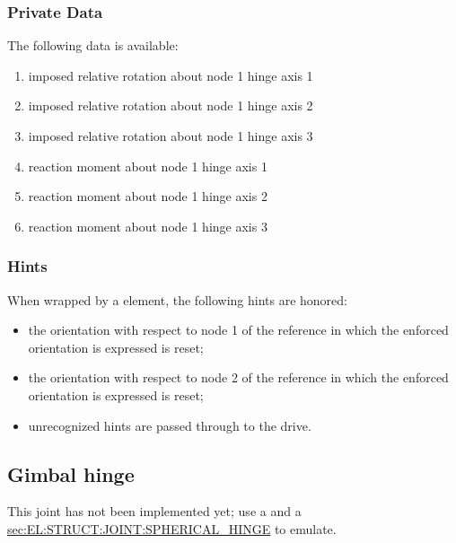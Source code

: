 \subsubsection{Private Data}
The following data is available:
\begin{enumerate}
\item {} imposed relative rotation about node 1 hinge axis 1
\item {} imposed relative rotation about node 1 hinge axis 2
\item {} imposed relative rotation about node 1 hinge axis 3
\item {} reaction moment about node 1 hinge axis 1
\item {} reaction moment about node 1 hinge axis 2
\item {} reaction moment about node 1 hinge axis 3
\end{enumerate}

\subsubsection{Hints}
When wrapped by a  element, the following hints are honored:
\begin{itemize}
\item {} the orientation with respect to node 1
of the reference in which the enforced orientation is expressed is reset;
\item {} the orientation with respect to node 2
of the reference in which the enforced orientation is expressed is reset;
\item unrecognized hints are passed through to the  drive.
\end{itemize}

\subsection{Gimbal hinge}
This joint has not been implemented yet; use a 
and a
\hyperref{\kw{spherical hinge}}{\kw{spherical hinge} (see Section~}{)}{sec:EL:STRUCT:JOINT:SPHERICAL_HINGE}
to emulate.

